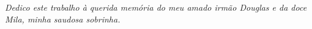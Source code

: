 \begin{dedicatoria}
   \vspace*{\fill}
   \centering
   \noindent
   \textit{Dedico este trabalho à querida memória do meu amado irmão Douglas e da doce Mila, minha saudosa sobrinha.} \vspace*{\fill}
\end{dedicatoria}
